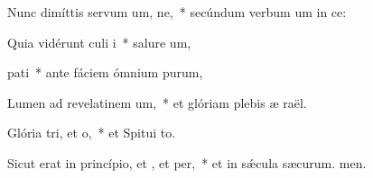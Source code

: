 \item Nunc dimíttis servum um, ne,~* secúndum verbum um in ce:
\item Quia vidérunt culi i~* salure um,
\item {} pati~* ante fáciem ómnium purum,
\item Lumen ad revelatinem um,~* et glóriam plebis æ raël.
\item Glória tri, et o,~* et Spitui to.
\item Sicut erat in princípio, et , et per,~* et in sǽcula sæcurum. men.
